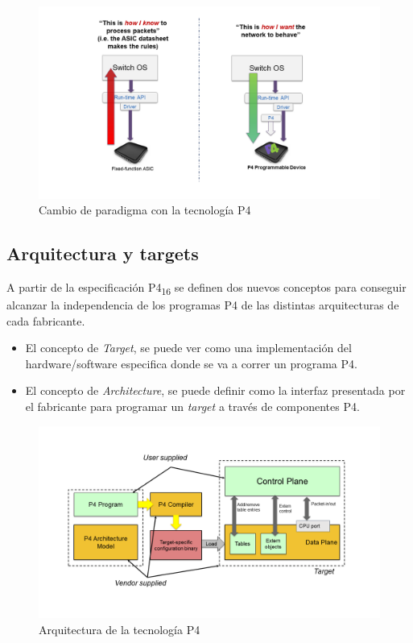 \begin{figure}[ht]
    \centering
    \includegraphics[width=13.5cm]{archivos/img/teoria/p4Paradigm.png}
    \caption{Cambio de paradigma con la tecnología P4 \cite{p42}}
    \label{fig:p4Paradigma}
\end{figure}


\subsection{Arquitectura y targets}

A partir de la especificación P4\textsubscript{16} se definen dos nuevos conceptos para conseguir alcanzar la independencia de los programas P4 de las distintas arquitecturas de cada fabricante. 

\begin{itemize}
    \item El concepto de \textit{Target}, se puede ver como una implementación del hardware/software especifica donde se va a correr un programa P4.
    \item El concepto de \textit{Architecture}, se puede definir como la interfaz presentada por el fabricante para programar un \textit{target} a través de componentes P4. 
\end{itemize}

\begin{figure}[ht]
    \centering
    \includegraphics[width=14.5cm]{archivos/img/teoria/p4arch.png}
    \caption{Arquitectura de la tecnología P4 \cite{p42}}
    \label{fig:p4arch}
\end{figure}

